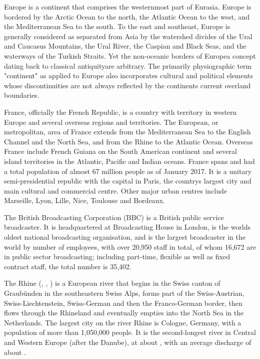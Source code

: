 \documentclass{article} \usepackage{iclr2019_conference,times}
\begin{document}
Europe is a continent that comprises the westernmost part of Eurasia. Europe is bordered by the Arctic Ocean to the north, the Atlantic Ocean to the west, and the Mediterranean Sea to the south. To the east and southeast, Europe is generally considered as separated from Asia by the watershed divides of the Ural and Caucasus Mountains, the Ural River, the Caspian and Black Seas, and the waterways of the Turkish Straits. Yet the non-oceanic borders of Europea concept dating back to classical antiquityare arbitrary. The primarily physiographic term "continent" as applied to Europe also incorporates cultural and political elements whose discontinuities are not always reflected by the continents current overland boundaries.

France, officially the French Republic, is a country with territory in western Europe and several overseas regions and territories. The European, or metropolitan, area of France extends from the Mediterranean Sea to the English Channel and the North Sea, and from the Rhine to the Atlantic Ocean. Overseas France include French Guiana on the South American continent and several island territories in the Atlantic, Pacific and Indian oceans. France spans and had a total population of almost 67 million people as of January 2017. It is a unitary semi-presidential republic with the capital in Paris, the countrys largest city and main cultural and commercial centre. Other major urban centres include Marseille, Lyon, Lille, Nice, Toulouse and Bordeaux.

The British Broadcasting Corporation (BBC) is a British public service broadcaster. It is headquartered at Broadcasting House in London, is the worlds oldest national broadcasting organisation, and is the largest broadcaster in the world by number of employees, with over 20,950 staff in total, of whom 16,672 are in public sector broadcasting; including part-time, flexible as well as fixed contract staff, the total number is 35,402.

The Rhine (, , ) is a European river that begins in the Swiss canton of Graubünden in the southeastern Swiss Alps, forms part of the 
Swiss-Austrian, Swiss-Liechtenstein, Swiss-German and then the Franco-German border, then flows through the Rhineland and eventually empties into the North Sea in the Netherlands. 
The largest city on the river Rhine is Cologne, Germany, with a population of more than 1,050,000 people. It is the second-longest river in Central and Western Europe (after the Danube), at about , with an average discharge of about .
\end{document}
